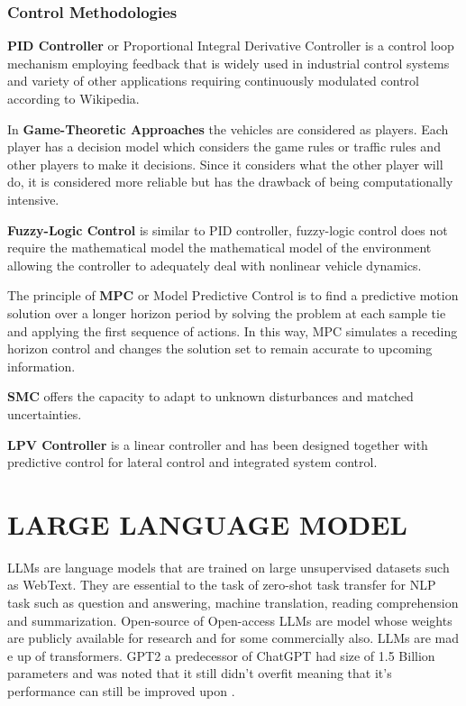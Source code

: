 \begin{spacing}{1.5}
\begin{sloppypar}
\subsubsection{Control Methodologies}
\textbf{PID Controller} or Proportional Integral Derivative Controller is a control loop mechanism employing feedback that is widely used in industrial control systems and variety of other applications requiring continuously modulated control according to Wikipedia.

In \textbf{Game-Theoretic Approaches} the vehicles are considered as players. Each player has a decision model which considers the game rules or traffic rules and other players to make it decisions. Since it considers what the other player will do, it is considered more reliable but has the drawback of being computationally intensive. 


\textbf{Fuzzy-Logic Control} is similar to PID controller, fuzzy-logic control does not require the mathematical model the mathematical model of the environment allowing the controller to adequately deal with nonlinear vehicle dynamics.

The principle of \textbf{MPC} or Model Predictive Control is to find a predictive motion solution over a longer horizon period by solving the problem at each sample tie and applying the first sequence of actions. In this way, MPC simulates a receding horizon control and changes the solution set to remain accurate to upcoming information.

\textbf{SMC} offers the capacity to adapt to unknown disturbances and matched uncertainties. 

\textbf{LPV Controller} is a linear controller and has been designed together with predictive control for lateral control and integrated system control.


\section{LARGE LANGUAGE MODEL}
LLMs are language models that are trained on large unsupervised datasets such as WebText. They are essential to the task of zero-shot task transfer for NLP task such as question and answering, machine translation, reading comprehension and summarization. Open-source of Open-access LLMs are model whose weights are publicly available for research and for some commercially also. LLMs are mad e up of transformers. GPT2 a predecessor of ChatGPT had size of 1.5 Billion parameters and was noted that it still didn't overfit meaning that it's performance can still be improved upon \cite{radford2019language}.

\end{sloppypar}
\end{spacing}
